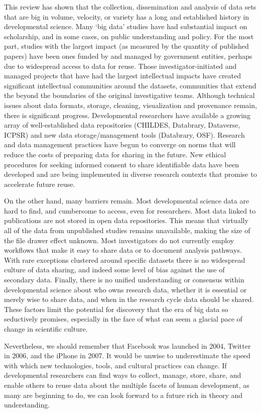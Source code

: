 \documentclass[letterpaper,man,apacite,natbib]{apa6}
\begin{document}
This review has shown that the collection, dissemination and analysis of data sets that are big in volume, velocity, or variety has a long and established history in developmental science.
Many `big data' studies have had substantial impact on scholarship, and in some cases, on public understanding and policy.
For the most part, studies with the largest impact (as measured by the quantity of published papers) have been ones funded by and managed by government entities, perhaps due to widespread access to data for reuse.
Those investigator-initiated and managed projects that have had the largest intellectual impacts have created significant intellectual communities around the datasets, communities that extend the beyond the boundaries of the original investigative teams.
Although technical issues about data formats, storage, cleaning, visualization and provenance remain, there is significant progress.
Developmental researchers have available a growing array of well-established data repositories (CHILDES, Databrary, Dataverse, ICPSR) and new data storage/management tools (Databrary, OSF).
Research and data management practices have begun to converge on norms that will reduce the costs of preparing data for sharing in the future.
New ethical procedures for seeking informed consent to share identifiable data have been developed and are being implemented in diverse research contexts that promise to accelerate future reuse.

On the other hand, many barriers remain.
Most developmental science data are hard to find, and cumbersome to access, even for researchers.
Most data linked to publications are not stored in open data repositories. 
This means that virtually all of the data from unpublished studies remains unavailable, making the size of the file drawer effect unknown.
Most investigators do not currently employ workflows that make it easy to share data or to document analysis pathways.
With rare exceptions clustered around specific datasets there is no widespread culture of data sharing, and indeed some level of bias against the use of secondary data.
Finally, there is no unified understanding or consensus within developmental science about who owns research data, whether it is essential or merely wise to share data, and when in the research cycle data should be shared.
These factors limit the potential for discovery that the era of big data so seductively promises, especially in the face of what can seem a glacial pace of change in scientific culture.

Nevertheless, we should remember that Facebook was launched in 2004, Twitter in 2006, and the iPhone in 2007.
It would be unwise to underestimate the speed with which new technologies, tools, and cultural practices can change.
If developmental researchers can find ways to collect, manage, store, share, and enable others to reuse data about the multiple facets of human development, as many are beginning to do, we can look forward to a future rich in theory and understanding.


\end{document}
